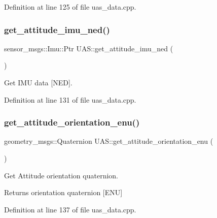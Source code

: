 Definition at line 125 of file uas\+\_\+data.\+cpp.

\mbox{\label{group__nodelib_ga31440655ed2c55b927fb6e3ed66a41a1}} 
\subsubsection{\texorpdfstring{get\_attitude\_imu\_ned()}{get\_attitude\_imu\_ned()}}
{\footnotesize\ttfamily sensor\+\_\+msgs\+::\+Imu\+::\+Ptr U\+A\+S\+::get\+\_\+attitude\+\_\+imu\+\_\+ned (\begin{DoxyParamCaption}{ }\end{DoxyParamCaption})}



Get I\+MU data \mbox{[}N\+ED\mbox{]}. 



Definition at line 131 of file uas\+\_\+data.\+cpp.

\mbox{\label{group__nodelib_gada6bb75eadc7ce6ad379c5e3a24625b0}} 
\subsubsection{\texorpdfstring{get\_attitude\_orientation\_enu()}{get\_attitude\_orientation\_enu()}}
{\footnotesize\ttfamily geometry\+\_\+msgs\+::\+Quaternion U\+A\+S\+::get\+\_\+attitude\+\_\+orientation\+\_\+enu (\begin{DoxyParamCaption}{ }\end{DoxyParamCaption})}



Get Attitude orientation quaternion. 

\begin{DoxyReturn}{Returns}
orientation quaternion \mbox{[}E\+NU\mbox{]} 
\end{DoxyReturn}


Definition at line 137 of file uas\+\_\+data.\+cpp.

\mbox{\label{group__nodelib_ga7524149188b866dfd044b2d6e03eb328}} 

